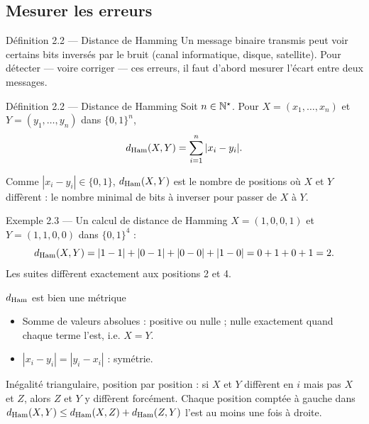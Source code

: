 \subsection{Mesurer les erreurs}

\begin{frame}{Définition 2.2 --- Distance de Hamming}
  \small Un message binaire transmis peut voir certains bits inversés par
  le bruit (canal informatique, disque, satellite). Pour détecter ---
  voire corriger --- ces erreurs, il faut d'abord mesurer l'écart
  entre deux messages.
  \begin{Enonce}{Définition 2.2 --- Distance de Hamming}
    Soit $n\in\operatorname{\mathbb{N}^{\star}}$. Pour $X=(x_1,\dots,x_n)$ et $Y=(y_1,\dots,y_n)$
    dans $\{0,1\}^n$,
    \[
      d_{\mathrm{Ham}}(X,Y) = \sum_{i=1}^{n}|x_i-y_i|.
    \]
  \end{Enonce}
  \small Comme $|x_i-y_i|\in\{0,1\}$, $d_{\mathrm{Ham}}(X,Y)$ est le nombre
  de positions où $X$ et $Y$ diffèrent : le nombre minimal de bits à
  inverser pour passer de $X$ à $Y$.
\end{frame}

\begin{frame}{Exemple 2.3 --- Un calcul de distance de Hamming}
  \small $X=(1,0,0,1)$ et $Y=(1,1,0,0)$ dans $\{0,1\}^4$ :
  \[
    d_{\mathrm{Ham}}(X,Y) = |1-1|+|0-1|+|0-0|+|1-0| = 0+1+0+1 = 2.
  \]
  \small Les suites diffèrent exactement aux positions 2 et 4.
\end{frame}

\begin{frame}{$d_{\mathrm{Ham}}$ est bien une métrique}
  \small
  \begin{itemize}
    \item Somme de valeurs absolues : positive ou nulle ; nulle
      exactement quand chaque terme l'est, i.e. $X=Y$.
    \item $|x_i-y_i| = |y_i-x_i|$ : symétrie.
  \end{itemize}
  \begin{AuTableau}
    \small Inégalité triangulaire, position par position : si $X$ et $Y$
    diffèrent en $i$ mais pas $X$ et $Z$, alors $Z$ et $Y$ y diffèrent
    forcément. Chaque position comptée à gauche dans
    $d_{\mathrm{Ham}}(X,Y)\leq d_{\mathrm{Ham}}(X,Z)+d_{\mathrm{Ham}}(Z,Y)$ l'est au moins une fois à
    droite.
  \end{AuTableau}
\end{frame}

